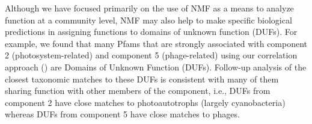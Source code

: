 
Although we have focused primarily on the use of NMF as a means to analyze function at a community level, NMF may also help to make specific biological predictions in assigning functions to domains of unknown function (DUFs). For example, we found that many Pfams that are strongly associated with component 2 (photosystem-related) and component 5 (phage-related) using our correlation approach () are Domains of Unknown Function (DUFs). Follow-up analysis of the closest taxonomic matches to these DUFs is consistent with many of them sharing function with other members of the component, i.e., DUFs from component 2 have close matches to photoautotrophs (largely cyanobacteria) whereas DUFs from component 5 have close matches to phages. 

